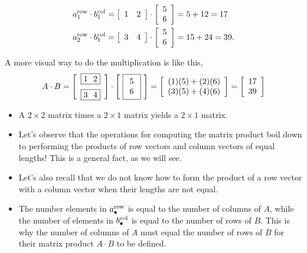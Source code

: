 \begin{align*}
    a_1^{\rm row} \cdot b_1^{\rm col} &= \left[\begin{array}{cc} 1 & 2\end{array}\right] \cdot \left[\begin{array}{c} 5  \\ 6
\end{array}\right] = 5 + 12 = 17 \\
    a_2^{\rm row} \cdot b_1^{\rm col} &= \left[\begin{array}{cc} 3 & 4\end{array}\right] \cdot \left[\begin{array}{c} 5  \\ 6
\end{array}\right] = 15 + 24 = 39.
\end{align*}

A more visual way to do the multiplication is like this,
\begin{equation}
    A \cdot B=  \left[\begin{array}{c}\boxed{ 1 ~~ 2} \medskip \\
\boxed{3 ~~ 4 }\end{array}\right] \cdot 
  \left[~\boxed{\begin{array}{c} 5 \\ 6\end{array} }~ \right]   =  \left[\begin{array}{c} (1)(5)+(2)(6) \\ (3)(5)+(4)(6)\end{array} \right] =\left[\begin{array}{c} 17 \\ 39\end{array} \right]
\end{equation}
\Qed

\begin{tcolorbox}[title=\textbf{Remarks}]
\begin{itemize}
    \item A $2 \times 2$ matrix times a $2 \times 1$ matrix yields a $2 \times 1$ matrix.
    \item Let's observe that the operations for computing the matrix product boil down to performing the products of row vectors and column vectors of equal lengths! This is a general fact, as we will see. 
    \item Let's also recall that we do not know how to form the product of a row vector with a column vector when their lengths are not equal.
    \item  The number elements in $a_\bullet^{\rm row}$ is equal to the number of columns of $A$, while the number of elements in $b_\bullet^{\rm col}$ is equal to the number of rows of $B$. This is why the number of columns of $A$ must equal the number of rows of $B$ for their matrix product $A \cdot B$ to be defined.
\end{itemize}

\end{tcolorbox}

